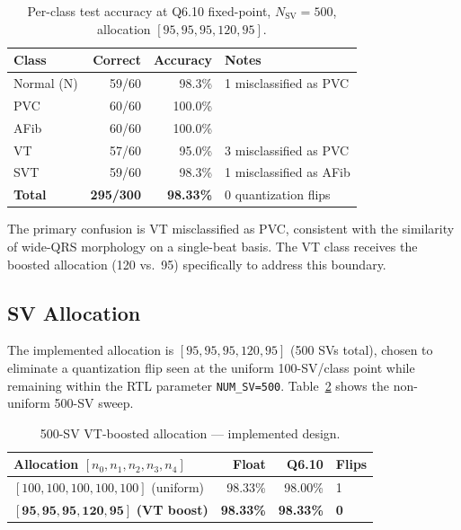 \documentclass[11pt]{article}
\newcommand{\SV}{N_{\mathrm{SV}}}
\begin{document}
\begin{table}[H]
  \centering
  \caption{Per-class test accuracy at Q6.10 fixed-point, $\SV=500$,
           allocation $[95,95,95,120,95]$.}
  \label{tab:accuracy}
  \small
  \begin{tabular}{lrrl}
    \toprule
    Class & Correct & Accuracy & Notes \\
    \midrule
    Normal (N) & 59/60 & 98.3\% & 1 misclassified as PVC \\
    PVC        & 60/60 & 100.0\% & \\
    AFib       & 60/60 & 100.0\% & \\
    VT         & 57/60 & 95.0\% & 3 misclassified as PVC \\
    SVT        & 59/60 & 98.3\% & 1 misclassified as AFib \\
    \midrule
    \textbf{Total} & \textbf{295/300} & \textbf{98.33\%} & 0 quantization flips \\
    \bottomrule
  \end{tabular}
\end{table}

The primary confusion is VT misclassified as PVC, consistent with the
similarity of wide-QRS morphology on a single-beat basis.  The VT class
receives the boosted allocation (120 vs.\ 95) specifically to address this
boundary.

\subsection{SV Allocation}

The implemented allocation is $[95,95,95,120,95]$ (500 SVs total), chosen
to eliminate a quantization flip seen at the uniform 100-SV/class point while
remaining within the RTL parameter \texttt{NUM\_SV=500}.  Table~\ref{tab:alloc}
shows the non-uniform 500-SV sweep.

\begin{table}[H]
  \centering
  \caption{500-SV VT-boosted allocation --- implemented design.}
  \label{tab:alloc}
  \small
  \begin{tabular}{lrrl}
    \toprule
    Allocation $[n_0,n_1,n_2,n_3,n_4]$ & Float & Q6.10 & Flips \\
    \midrule
    $[100,100,100,100,100]$ (uniform) & 98.33\% & 98.00\% & 1 \\
    $\mathbf{[95,95,95,120,95]}$ \textbf{(VT boost)} & \textbf{98.33\%} & \textbf{98.33\%} & \textbf{0} \\
    \bottomrule
  \end{tabular}
\end{table}
\end{document}
